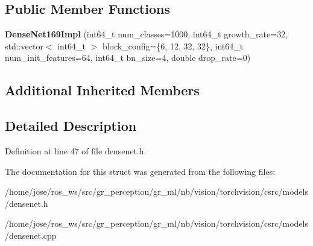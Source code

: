 \subsection*{Public Member Functions}
\begin{DoxyCompactItemize}
\item 
\mbox{\label{structvision_1_1models_1_1DenseNet169Impl_a304bd048010af3c8c290ab8e2911a125}} 
{\bfseries Dense\+Net169\+Impl} (int64\+\_\+t num\+\_\+classes=1000, int64\+\_\+t growth\+\_\+rate=32, std\+::vector$<$ int64\+\_\+t $>$ block\+\_\+config=\{6, 12, 32, 32\}, int64\+\_\+t num\+\_\+init\+\_\+features=64, int64\+\_\+t bn\+\_\+size=4, double drop\+\_\+rate=0)
\end{DoxyCompactItemize}
\subsection*{Additional Inherited Members}


\subsection{Detailed Description}


Definition at line 47 of file densenet.\+h.



The documentation for this struct was generated from the following files\+:\begin{DoxyCompactItemize}
\item 
/home/jose/ros\+\_\+ws/src/gr\+\_\+perception/gr\+\_\+ml/nb/vision/torchvision/csrc/models/densenet.\+h\item 
/home/jose/ros\+\_\+ws/src/gr\+\_\+perception/gr\+\_\+ml/nb/vision/torchvision/csrc/models/densenet.\+cpp\end{DoxyCompactItemize}

